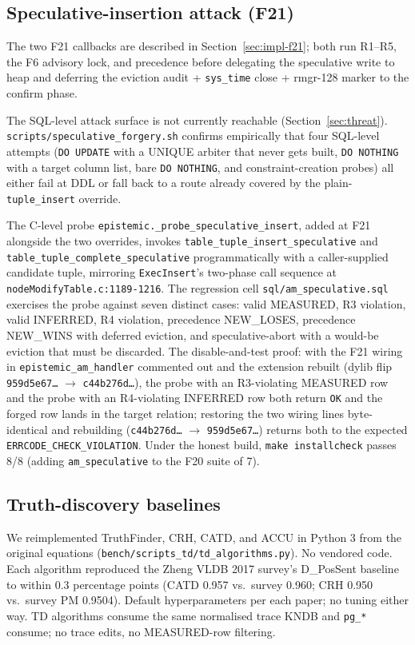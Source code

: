 \documentclass[sigconf, nonacm]{acmart}
\begin{document}
\subsection{Speculative-insertion attack (F21)}
\label{sec:eval-f21}
The two F21 callbacks are described in Section~\ref{sec:impl-f21}; both run R1--R5, the F6 advisory lock, and precedence before delegating the speculative write to heap and deferring the eviction audit + \texttt{sys\_time} close + rmgr-128 marker to the confirm phase.

The SQL-level attack surface is not currently reachable (Section~\ref{sec:threat}). \texttt{scripts/speculative\_forgery.sh} confirms empirically that four SQL-level attempts (\texttt{DO UPDATE} with a UNIQUE arbiter that never gets built, \texttt{DO NOTHING} with a target column list, bare \texttt{DO NOTHING}, and constraint-creation probes) all either fail at DDL or fall back to a route already covered by the plain-\texttt{tuple\_insert} override.

The C-level probe \texttt{epistemic.\_probe\_speculative\_insert}, added at F21 alongside the two overrides, invokes \texttt{table\_tuple\_insert\_speculative} and \texttt{table\_tuple\_complete\_speculative} programmatically with a caller-supplied candidate tuple, mirroring \texttt{ExecInsert}'s two-phase call sequence at \texttt{nodeModifyTable.c:1189-1216}. The regression cell \texttt{sql/am\_speculative.sql} exercises the probe against seven distinct cases: valid MEASURED, R3 violation, valid INFERRED, R4 violation, precedence NEW\_LOSES, precedence NEW\_WINS with deferred eviction, and speculative-abort with a would-be eviction that must be discarded. The disable-and-test proof: with the F21 wiring in \texttt{epistemic\_am\_handler} commented out and the extension rebuilt (dylib flip \texttt{959d5e67\ldots} $\to$ \texttt{c44b276d\ldots}), the probe with an R3-violating MEASURED row and the probe with an R4-violating INFERRED row both return \texttt{OK} and the forged row lands in the target relation; restoring the two wiring lines byte-identical and rebuilding (\texttt{c44b276d\ldots} $\to$ \texttt{959d5e67\ldots}) returns both to the expected \texttt{ERRCODE\_CHECK\_VIOLATION}. Under the honest build, \texttt{make installcheck} passes 8/8 (adding \texttt{am\_speculative} to the F20 suite of 7).

\subsection{Truth-discovery baselines}
We reimplemented TruthFinder, CRH, CATD, and ACCU in Python 3 from the original equations (\texttt{bench/scripts\_td/td\_algorithms.py}). No vendored code. Each algorithm reproduced the Zheng VLDB 2017 survey's D\_PosSent baseline to within 0.3 percentage points (CATD 0.957 vs.\ survey 0.960; CRH 0.950 vs.\ survey PM 0.9504). Default hyperparameters per each paper; no tuning either way. TD algorithms consume the same normalised trace KNDB and \texttt{pg\_*} consume; no trace edits, no MEASURED-row filtering.
\end{document}
